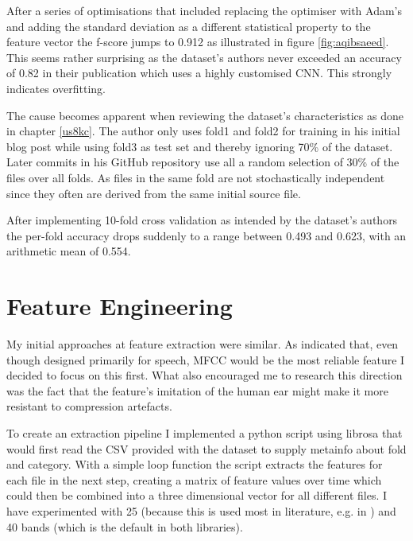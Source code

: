 After a series of optimisations that included replacing the optimiser with Adam's and adding the standard deviation as a different statistical property to the feature vector the f-score jumps to 0.912 as illustrated in figure \ref{fig:aqibsaeed}. This seems rather surprising as the dataset's authors never exceeded an accuracy of 0.82 in their publication \cite{DBLP:journals/corr/SalamonB16} which uses a highly customised CNN. This strongly indicates overfitting.

The cause becomes apparent when reviewing the dataset's characteristics as done in chapter \ref{us8kc}. The author only uses fold1 and fold2 for training in his initial blog post while using fold3 as test set and thereby ignoring 70\% of the dataset. Later commits in his GitHub repository use all a random selection of 30\% of the files over all folds. As files in the same fold are not stochastically independent since they often are derived from the same initial source file.


After implementing 10-fold cross validation as intended by the dataset's authors the per-fold accuracy drops suddenly to a range between 0.493 and 0.623, with an arithmetic mean of 0.554.



\section{Feature Engineering}
\label{chap:feature-eng}

My initial approaches at feature extraction were similar. As \cite{DBLP:journals/corr/SalamonB16} indicated that, even though designed primarily for speech, MFCC would be the most reliable feature I decided to focus on this first. What also encouraged me to research this direction was the fact that the feature's imitation of the human ear might make it more resistant to compression artefacts.

To create an extraction pipeline I implemented a python script using librosa that would first read the CSV  provided with the dataset to supply metainfo about fold and category.
With a simple loop function the script extracts the features for each file in the next step, creating a matrix of feature values over time which could then be combined into a three dimensional vector for all different files. I have experimented with 25 (because this is used most in literature, e.g. in \cite{7177954}) and 40 bands (which is the default in both libraries).

